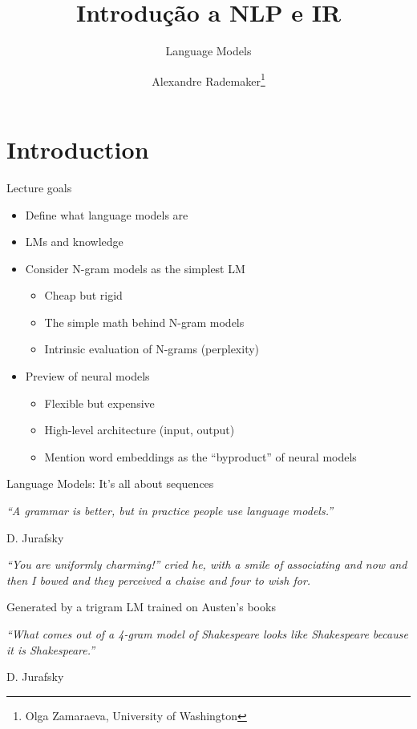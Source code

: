 \documentclass{beamer}
\title{Introdução a NLP e IR}
\author{Alexandre Rademaker\thanks{Olga Zamaraeva, University of Washington}}
\institute{FGV/EMAp}
\subtitle{Language Models}
\begin{document}
   
\begin{frame}
  \maketitle
\end{frame}

\section{Introduction}

\begin{frame}{Lecture goals}
  \begin{itemize}
  \item Define what language models are
  \item LMs and knowledge
  \item Consider N-gram models as the simplest LM
    \begin{itemize}
    \item Cheap but rigid
    \item The simple math behind N-gram models
    \item Intrinsic evaluation of N-grams (perplexity)
    \end{itemize}
  \item Preview of neural models
    \begin{itemize}
    \item Flexible but expensive
    \item High-level architecture (input, output)
    \item Mention word embeddings as the ``byproduct'' of neural models
    \end{itemize}
  \end{itemize}
  
\end{frame}


\begin{frame}{Language Models: It's all about sequences}

{\it ``A grammar is better, but in practice people use language models.''}
\begin{flushright}
D. Jurafsky
\end{flushright}

\vspace{0.6 cm}

{\it ``You are uniformly charming!'' cried he, with a smile of associating and now
and then I bowed and they perceived a chaise and four to wish for.}
\begin{flushright}
{\footnotesize Generated by a trigram LM trained on Austen's books}
\end{flushright}

\vspace{0.6 cm}

{\it ``What comes out of a 4-gram model of Shakespeare looks like Shakespeare because it is Shakespeare.'' } 
\begin{flushright}
D. Jurafsky
\end{flushright}
\end{frame}
\end{document}
